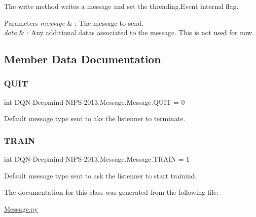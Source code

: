 The write method writes a message and set the threading.\+Event internal flag. 


\begin{DoxyParams}{Parameters}
{\em message} & \+: The message to send. \\
\hline
{\em data} & \+: Any additional datas associated to the message. This is not used for now \\
\hline
\end{DoxyParams}


\subsection{Member Data Documentation}
\hypertarget{classDQN-Deepmind-NIPS-2013_1_1Message_1_1Message_a87173863ddcb622f03cefa6dcf9cda53}{}\label{classDQN-Deepmind-NIPS-2013_1_1Message_1_1Message_a87173863ddcb622f03cefa6dcf9cda53} 
\subsubsection{\texorpdfstring{Q\+U\+IT}{QUIT}}
{\footnotesize\ttfamily int D\+QN-\/Deepmind-\/N\+I\+PS-\/2013.Message.\+Message.\+Q\+U\+IT = 0\hspace{0.3cm}{\ttfamily [static]}}



Default message type sent to aks the listenner to terminate. 

\hypertarget{classDQN-Deepmind-NIPS-2013_1_1Message_1_1Message_a440cc65343a167377dae7c508e571c79}{}\label{classDQN-Deepmind-NIPS-2013_1_1Message_1_1Message_a440cc65343a167377dae7c508e571c79} 
\subsubsection{\texorpdfstring{T\+R\+A\+IN}{TRAIN}}
{\footnotesize\ttfamily int D\+QN-\/Deepmind-\/N\+I\+PS-\/2013.Message.\+Message.\+T\+R\+A\+IN = 1\hspace{0.3cm}{\ttfamily [static]}}



Default message type sent to ask the listenner to start trainind. 



The documentation for this class was generated from the following file\+:\begin{DoxyCompactItemize}
\item 
\hyperlink{Message_8py}{Message.\+py}\end{DoxyCompactItemize}
